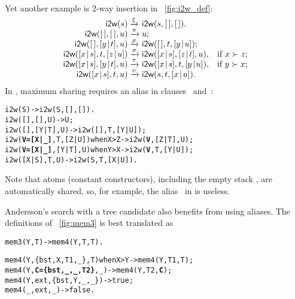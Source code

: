 \noindent Yet another example is 2-way insertion in
\fig~\vref{fig:i2w_def}:
\begin{equation*}
\begin{array}{@{}r@{\;}l@{\;}ll@{}}
\fun{i2w}(s)         & \xrightarrow{\smash{\xi}}
                     & \fun{i2w}(s,\el,\el).\\
\fun{i2w}(\el,\el,u) & \xrightarrow{\smash{\pi}}
                     & u;\\
\fun{i2w}(\el,\cons{y}{t},u)
                     & \xrightarrow{\smash{\rho}}
                     & \fun{i2w}(\el,t,\cons{y}{u});\\
\fun{i2w}(\cons{x}{s},t,\cons{z}{u})
                     & \xrightarrow{\smash{\sigma}}
                     & \fun{i2w}(\cons{x}{s},\cons{z}{t},u),
                     & \text{if \(x \succ z\)};\\
\fun{i2w}(\cons{x}{s},\cons{y}{t},u)
                     & \xrightarrow{\smash{\tau}}
                     & \fun{i2w}(\cons{x}{s},t,\cons{y}{u}),
                     & \text{if \(y \succ x\)};\\
\fun{i2w}(\cons{x}{s},t,u)
                     & \xrightarrow{\smash{\upsilon}}
                     & \fun{i2w}(s,t,\cons{x}{u}).
\end{array}
\end{equation*}
In \Erlang, maximum sharing requires an alias in clauses
\clause{\sigma}~and~\clause{\tau}:
\begin{alltt}
i2w(S)                              -> i2w(S,[],[]).
i2w(     [],   [],    U)            -> U;
i2w(     [],[Y|T],    U)            -> i2w([],T,[Y|U]);
i2w(\textbf{V=[X|\_]},    T,[Z|U]) when X > Z -> i2w(\textbf{V},[Z|T],U);
i2w(\textbf{V=[X|\_]},[Y|T],    U) when Y > X -> i2w(\textbf{V},T,[Y|U]);
i2w(  [X|S],    T,    U)            -> i2w(S,T,[X|U]).
\end{alltt}
Note that atoms (constant constructors), including the empty stack
\erlcode{[]}, are automatically shared, so, for example, the
alias~ in  is useless.

Andersson's search with a tree candidate also benefits from using
aliases. The definitions of \fig~\vref{fig:mem3} is best translated as
\begin{alltt}
mem3(Y,T) -> mem4(Y,T,T).

mem4(Y,  \{bst,X,T1,_\},        T) when X > Y -> mem4(Y,T1,T);
mem4(Y,\textbf{C=\{bst,\_,\_,T2\}},        \_)            -> mem4(Y,T2,\textbf{C});
mem4(Y,         ext,\{bst,Y,\_,\_\})            -> true;
mem4(\_,           ext,        \_)            -> false.
\end{alltt}

